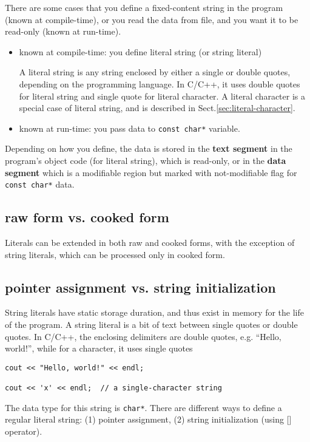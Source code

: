 There are some cases that you define a fixed-content string in the program
(known at compile-time), or you read the data from file, and you want it to be
read-only (known at run-time). 
\begin{itemize}
  \item known at compile-time: you define literal string (or string literal)
  
A literal string is any string enclosed by either a single or double quotes,
depending on the programming language. In C/C++, it uses double quotes for
literal string and single quote for literal character.
A literal character is a special case of literal string, and is described in
Sect.\ref{sec:literal-character}.
  
  \item known at run-time: you pass data to \verb!const char*! variable.
\end{itemize}

Depending on how you define, the data is stored in the {\bf text segment} in the
program's object code (for literal string), which is read-only, or in the {\bf
data segment} which is a modifiable region but marked with not-modifiable flag
for \verb!const char*! data.

\subsection{raw form vs. cooked form}

Literals can be extended in both raw and cooked forms, with the exception of
string literals, which can be processed only in cooked form. 

\subsection{pointer assignment vs. string initialization}

String literals have static storage duration, and thus exist in memory for the
life of the program.  A string literal is a bit of text between single quotes or
double quotes. In C/C++, the enclosing delimiters are double quotes, e.g.
``Hello, world!'', while for a character, it uses single quotes
\begin{Verbatim}
cout << "Hello, world!" << endl;

cout << 'x' << endl;  // a single-character string
\end{Verbatim}
The data type for this string is \verb!char*!. There are different ways to
define a regular literal string: (1) pointer assignment, (2) string
initialization (using [] operator).

